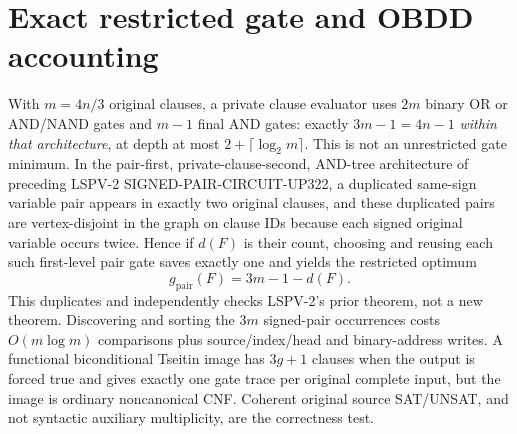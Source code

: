 \documentclass[11pt]{article}
\begin{document}
\section{Exact restricted gate and OBDD accounting}
With $m=4n/3$ original clauses, a private clause evaluator uses $2m$ binary OR or AND/NAND gates and $m-1$ final AND gates: exactly $3m-1=4n-1$ \emph{within that architecture}, at depth at most $2+\lceil\log_2m\rceil$. This is not an unrestricted gate minimum. In the pair-first, private-clause-second, AND-tree architecture of preceding LSPV-2 SIGNED-PAIR-CIRCUIT-UP322, a duplicated same-sign variable pair appears in exactly two original clauses, and these duplicated pairs are vertex-disjoint in the graph on clause IDs because each signed original variable occurs twice. Hence if $d(F)$ is their count, choosing and reusing each such first-level pair gate saves exactly one and yields the restricted optimum
\[
g_{\mathrm{pair}}(F)=3m-1-d(F).
\]
This duplicates and independently checks LSPV-2's prior theorem, not a new theorem. Discovering and sorting the $3m$ signed-pair occurrences costs $O(m\log m)$ comparisons plus source/index/head and binary-address writes. A functional biconditional Tseitin image has $3g+1$ clauses when the output is forced true and gives exactly one gate trace per original complete input, but the image is ordinary noncanonical CNF. Coherent original source SAT/UNSAT, and not syntactic auxiliary multiplicity, are the correctness test.
\end{document}
